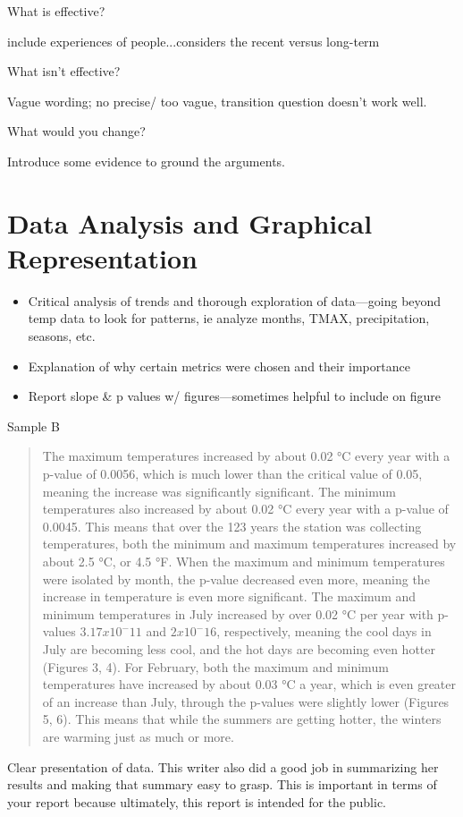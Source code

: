 \documentclass{article}\usepackage[]{graphicx}\usepackage[]{color}
\begin{document}
What is effective?

include experiences of people...considers the recent versus long-term

What isn't effective?

Vague wording; no precise/ too vague, transition question doesn't work well.


What would you change?

Introduce some evidence to ground the arguments.

\section{Data Analysis and Graphical Representation}
\begin{itemize}
  \item Critical analysis of trends and thorough exploration of data—going beyond temp data to look for patterns, ie analyze months, TMAX, precipitation, seasons, etc.
  \item Explanation of why certain metrics were chosen and their importance
  \item Report slope \& p values w/ figures—sometimes helpful to include on figure
\end{itemize}

Sample B
\begin{quote}
The maximum temperatures increased by about 0.02 °C every year with a p-value of 0.0056, which is much lower than the critical value of 0.05, meaning the increase was significantly significant. The minimum temperatures also increased by about 0.02 °C every year with a p-value of 0.0045. This means that over the 123 years the station was collecting temperatures, both the minimum and maximum temperatures increased by about 2.5 °C, or 4.5 °F. When the maximum and minimum temperatures were isolated by month, the p-value decreased even more, meaning the increase in temperature is even more significant. The maximum and minimum temperatures in July increased by over 0.02 °C per year with p-values $3.17 x10^-11$ and $2 x 10^-16$, respectively, meaning the cool days in July are becoming less cool, and the hot days are becoming even hotter (Figures 3, 4). For February, both the maximum and minimum temperatures have increased by about 0.03 °C a year, which is even greater of an increase than July, through the p-values were slightly lower (Figures 5, 6). This means that while the summers are getting hotter, the winters are warming just as much or more.
\end{quote}
Clear presentation of data. This writer also did a good job in summarizing her results and making that summary easy to grasp. This is important in terms of your report because ultimately, this report is intended for the public. 
\end{document}

